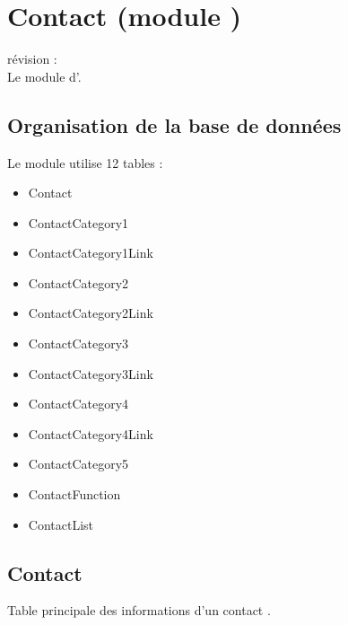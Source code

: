 

\clearpage
\section{Contact (module \contact)}

révision : \\
Le module \contact d'\obm.\\

\subsection{Organisation de la base de données}

Le module \contact utilise 12 tables :
\begin{itemize}
 \item Contact
 \item ContactCategory1
 \item ContactCategory1Link
 \item ContactCategory2
 \item ContactCategory2Link
 \item ContactCategory3
 \item ContactCategory3Link
 \item ContactCategory4
 \item ContactCategory4Link
 \item ContactCategory5
 \item ContactFunction
 \item ContactList
\end{itemize}

\subsection{Contact}
Table principale des informations d'un contact . \\

